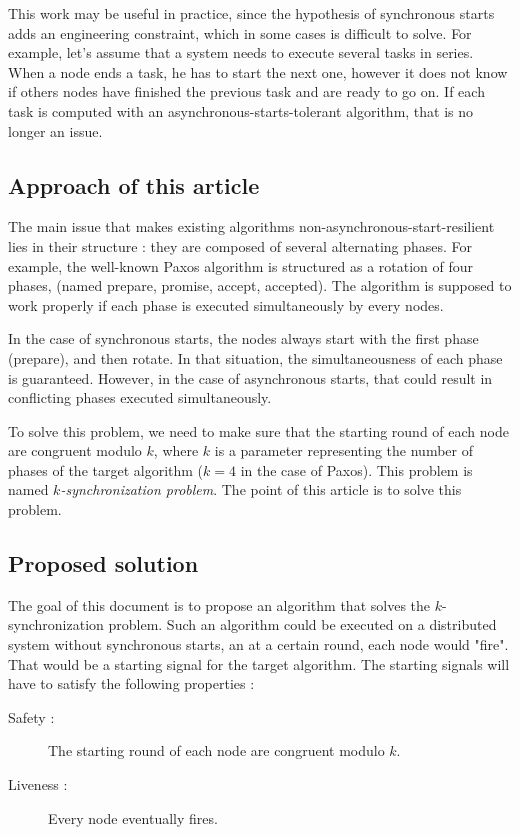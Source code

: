 \documentclass{article}
\begin{document}
This work may be useful in practice, since the hypothesis of synchronous starts adds an engineering constraint, which in some cases is difficult to solve.
For example, let's assume that a system needs to execute several tasks in series.
When a node ends a task, he has to start the next one, however it does not know if others nodes have finished the previous task and are ready to go on.
If each task is computed with an asynchronous-starts-tolerant algorithm, that is no longer an issue.

\subsection{Approach of this article}

The main issue that makes existing algorithms non-asynchronous-start-resilient lies in their structure :
they are composed of several alternating phases.
For example, the well-known Paxos \cite{paxos} algorithm is structured as a rotation of four phases, (named prepare,
promise, accept, accepted).
The algorithm is supposed to work properly if each phase is executed simultaneously by every nodes.

In the case of synchronous starts, the nodes always start with the first phase (prepare), and then rotate.
In that situation, the simultaneousness of each phase is guaranteed.
However, in the case of asynchronous starts, that could result in conflicting phases executed simultaneously.

To solve this problem, we need to make sure that the starting round of each node are congruent modulo $k$,
where $k$ is a parameter representing the number of phases of the target algorithm ($k=4$ in the case of Paxos).
This problem is named \emph{$k$-synchronization problem}.
The point of this article is to solve this problem.

\subsection{Proposed solution}

The goal of this document is to propose an algorithm that solves the $k$-synchronization problem.
Such an algorithm could be executed on a distributed system without synchronous starts,
an at a certain round, each node would "fire".
That would be a starting signal for the target algorithm.
The starting signals will have to satisfy the following properties :
\begin{description}
	\item[Safety :] The starting round of each node are congruent modulo $k$.
	\item[Liveness :] Every node eventually fires.
\end{description}
\end{document}
